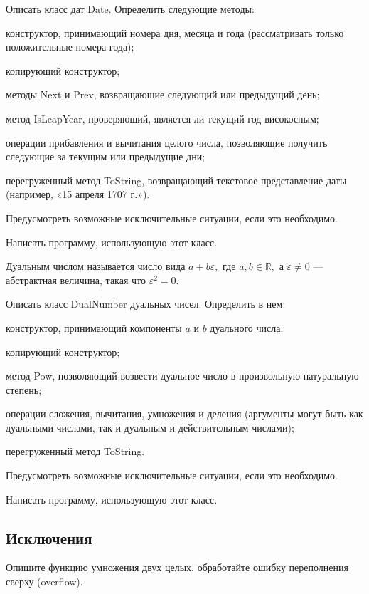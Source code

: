 \task Описать класс дат Date. Определить следующие методы:
\begin{itemize*}
\item конструктор, принимающий номера дня, месяца и года
  (рассматривать только положительные номера года);
\item копирующий конструктор;
\item методы Next и Prev, возвращающие следующий или предыдущий день;
\item метод IsLeapYear, проверяющий, является ли текущий год
  високосным;
\item операции прибавления и вычитания целого числа, позволяющие
  получить следующие за текущим или предыдущие дни;
\item перегруженный метод ToString, возвращающий текстовое
  представление даты (например, «15 апреля 1707 г.»).
\end{itemize*}

Предусмотреть возможные исключительные ситуации, если это необходимо.

Написать программу, использующую этот класс.

\task Дуальным числом называется число вида $a+b\varepsilon,$ где $a,
b \in \mathbb{R},$ а $\varepsilon \neq 0$ — абстрактная величина,
такая что $\varepsilon^2 = 0$.

Описать класс DualNumber дуальных чисел. Определить в нем:
\begin{itemize*}
\item конструктор, принимающий компоненты $a$ и $b$ дуального числа;
\item копирующий конструктор;
\item метод Pow, позволяющий возвести дуальное число в произвольную
  натуральную степень;
\item операции сложения, вычитания, умножения и деления (аргументы
  могут быть как дуальными числами, так и дуальным и действительным
  числами);
\item перегруженный метод ToString.
\end{itemize*}

Предусмотреть возможные исключительные ситуации, если это необходимо.

Написать программу, использующую этот класс.

\subsection{Исключения}

Опишите функцию умножения двух целых, обработайте ошибку переполнения сверху (overflow).

